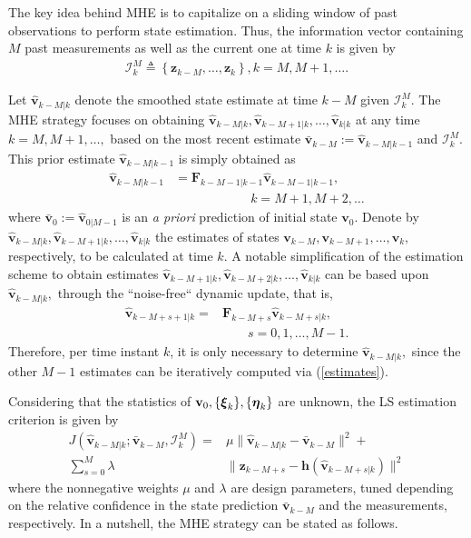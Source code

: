 \documentclass[conference]{IEEEtran}
\def\ccalI{{\ensuremath{\mathcal I}}}
\def\bbF{{\ensuremath{\mathbf F}}}
\def\bbh{{\ensuremath{\mathbf h}}}
\def\bbv{{\ensuremath{\mathbf v}}}
\def\bbz{{\ensuremath{\mathbf z}}}
\def\bbeta{{\mbox{\boldmath $\eta$}}}
\def\bbxi{{\mbox{\boldmath $\xi$}}}
\begin{document}
The key idea behind MHE is to capitalize on a sliding window of past observations to perform state estimation. Thus, the information vector containing
$M$ past measurements as well as the current one at time $k$ is given by
\begin{align}
\mathcal{I}_k^M\triangleq \left\{\bbz_{k-M},\ldots,\bbz_k\right\}, k=M,M+1,\ldots.\label{infor vec}
\end{align}

Let $\hat{\bbv}_{k-M|k}$ denote the smoothed state estimate at time $k-M$ given $\mathcal{I}_k^M.$ The
MHE strategy focuses on obtaining $\hat{\bbv}_{k-M|k},\hat{\bbv}_{k-M+1|k},\ldots,\hat{\bbv}_{k|k}$ at any time $k=M,M+1,\ldots,$ based on the most recent
estimate $\bar{\bbv}_{k-M}:=\hat{\bbv}_{k-M|k-1}$ and $\mathcal{I}_k^M.$ This prior estimate $\hat{\bbv}_{k-M|k-1}$ is simply obtained as
\begin{align}
\hat{\bbv}_{k-M|k-1}&=\bbF_{k-M-1|k-1}\hat\bbv_{k-M-1|k-1},\nonumber\\
&\qquad\qquad\qquad k=M+1,M+2,\ldots
\end{align}
where $\bar{\bbv}_0:=\hat\bbv_{0|M-1}$ is an \emph{a priori} prediction of initial state $\bbv_0.$
Denote by $\hat\bbv_{k-M|k},\hat\bbv_{k-M+1|k},\ldots,\hat\bbv_{k|k}$ the estimates of states $\bbv_{k-M},\bbv_{k-M+1},\ldots,\bbv_{k},$ respectively, to be calculated at time $k.$ A notable simplification of the estimation scheme to obtain estimates $\hat\bbv_{k-M+1|k},\hat\bbv_{k-M+2|k},\ldots,\hat\bbv_{k|k}$ can be based upon $\hat\bbv_{k-M|k},$ through the ``noise-free`` dynamic update, that is,
\begin{align}
\hat{\bbv}_{k-M+s+1|k}=&\bbF_{k-M+s} \hat{\bbv}_{k-M+s|k}, \nonumber\\ &\qquad s=0,1,\ldots,M-1.\label{estimates}
\end{align}
Therefore, per time instant $k$, it is only necessary to determine $\hat\bbv_{k-M|k},$ since the other $M-1$ estimates can be iteratively computed via (\ref{estimates}).





Considering that the statistics of $\bbv_0,\{\bbxi_k\},\{\bbeta_k\}$ are unknown, the LS estimation criterion is given by
\begin{align}
J(\hat{\bbv}_{k\!-\!M|k};\bar{\bbv}_{k\!-\!M},\ccalI_k^M)=&\mu \big\|\hat{\bbv}_{k-M|k}-\bar{\bbv}_{k-M}\big\|^2+\nonumber\\
\sum_{s=0}^M\lambda&\big\|\bbz_{k\!-\!M+s}\!-\!\bbh(\hat{\bbv}_{k\!-\!M+s|k})\big\|^2\label{cost}
\end{align}
where the nonnegative weights $\mu$ and $\lambda$ are design parameters, tuned depending on the relative confidence in the state prediction $\bar{\bbv}_{k-M}$ and the measurements, respectively. In a nutshell, the MHE strategy can be stated as follows.
\end{document}
